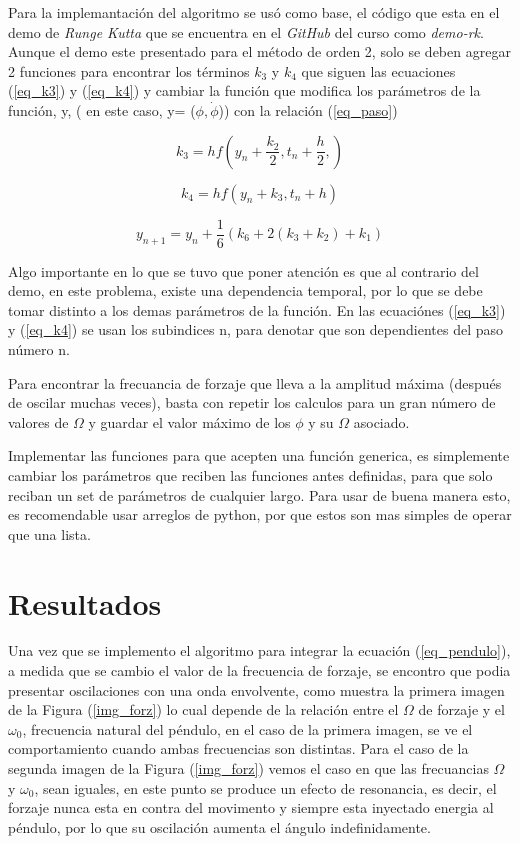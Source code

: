 \documentclass[10pt]{article}
\begin{document}
 Para la implemantación del algoritmo se usó como base, el código que esta en el demo de \textit{Runge Kutta} que se encuentra en el \textit{GitHub} del curso como \textit{demo-rk}. Aunque el demo este presentado para el método de orden 2, solo se deben agregar 2 funciones para encontrar los términos $k_3$ y $k_4$ que siguen las ecuaciones (\ref{eq_k3}) y (\ref{eq_k4}) y cambiar la función que modifica los parámetros de la función, y, ( en este caso, y= ($\phi,\dot{\phi}$)) con la relación (\ref{eq_paso})
 
 \begin{equation}
k_3=hf(y_n +\dfrac{k_2}{2},t_n+\dfrac{h}{2},)
\label{eq_k3}
\end{equation}

\begin{equation}
k_4=hf(y_n +k_3,t_n+h)
\label{eq_k4}
\end{equation}

\begin{equation}
y_{n+1} = y_{n}+\frac{1}{6}(k_6+2(k_3+k_2)+k_1)
\label{eq_paso}
\end{equation}
 
Algo importante en lo que se tuvo que poner atención es que al contrario del demo, en este problema, existe una dependencia temporal, por lo que se debe tomar distinto a los demas parámetros de la función. En las ecuaciónes (\ref{eq_k3}) y (\ref{eq_k4}) se usan los subindices n, para denotar que son dependientes del paso número n.

Para encontrar la frecuancia de forzaje que lleva a la amplitud máxima (después de oscilar muchas veces), basta con repetir los calculos para un gran número de valores de $\Omega$ y guardar el valor máximo de los $\phi$ y su $\Omega$ asociado.

Implementar las funciones para que acepten una función generica, es simplemente cambiar los parámetros que reciben las funciones antes definidas, para que solo reciban un set de parámetros de cualquier largo. Para usar de buena manera esto, es recomendable usar arreglos de python, por que estos son mas simples de operar que una lista.

\section{Resultados}
 Una vez que se implemento el algoritmo para integrar la ecuación (\ref{eq_pendulo}), a medida que se cambio el valor de la frecuencia de forzaje, se encontro que podia presentar oscilaciones con una onda envolvente, como muestra la primera imagen de la Figura (\ref{img_forz}) lo cual depende de la relación entre el $\Omega$ de forzaje y el $\omega_0$, frecuencia natural del péndulo, en el caso de la primera imagen, se ve el comportamiento cuando ambas frecuencias son distintas. Para el caso de la segunda imagen de la Figura (\ref{img_forz}) vemos el caso en que las frecuancias $\Omega$ y $\omega_0$, sean iguales, en este punto se produce un efecto de resonancia, es decir, el forzaje nunca esta en contra del movimento y siempre esta inyectado energia al péndulo, por lo que su oscilación aumenta el ángulo indefinidamente.  
\end{document}
